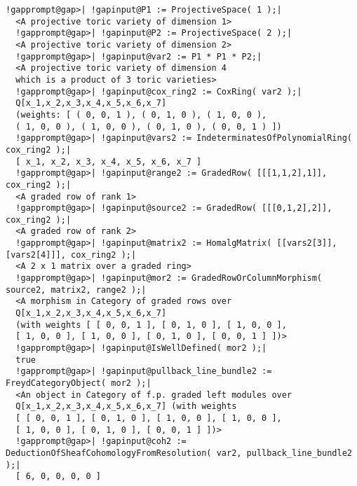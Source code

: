 \documentclass[a4paper,11pt]{report}
\begin{document}
{{\begin{Verbatim}[commandchars=!@|,fontsize=\small,frame=single,label=Example]
  !gapprompt@gap>| !gapinput@P1 := ProjectiveSpace( 1 );|
  <A projective toric variety of dimension 1>
  !gapprompt@gap>| !gapinput@P2 := ProjectiveSpace( 2 );|
  <A projective toric variety of dimension 2>
  !gapprompt@gap>| !gapinput@var2 := P1 * P1 * P2;|
  <A projective toric variety of dimension 4 
  which is a product of 3 toric varieties>
  !gapprompt@gap>| !gapinput@cox_ring2 := CoxRing( var2 );|
  Q[x_1,x_2,x_3,x_4,x_5,x_6,x_7]
  (weights: [ ( 0, 0, 1 ), ( 0, 1, 0 ), ( 1, 0, 0 ),
  ( 1, 0, 0 ), ( 1, 0, 0 ), ( 0, 1, 0 ), ( 0, 0, 1 ) ])
  !gapprompt@gap>| !gapinput@vars2 := IndeterminatesOfPolynomialRing( cox_ring2 );|
  [ x_1, x_2, x_3, x_4, x_5, x_6, x_7 ]
  !gapprompt@gap>| !gapinput@range2 := GradedRow( [[[1,1,2],1]], cox_ring2 );|
  <A graded row of rank 1>
  !gapprompt@gap>| !gapinput@source2 := GradedRow( [[[0,1,2],2]], cox_ring2 );|
  <A graded row of rank 2>
  !gapprompt@gap>| !gapinput@matrix2 := HomalgMatrix( [[vars2[3]],[vars2[4]]], cox_ring2 );|
  <A 2 x 1 matrix over a graded ring>
  !gapprompt@gap>| !gapinput@mor2 := GradedRowOrColumnMorphism( source2, matrix2, range2 );|
  <A morphism in Category of graded rows over
  Q[x_1,x_2,x_3,x_4,x_5,x_6,x_7]
  (with weights [ [ 0, 0, 1 ], [ 0, 1, 0 ], [ 1, 0, 0 ],
  [ 1, 0, 0 ], [ 1, 0, 0 ], [ 0, 1, 0 ], [ 0, 0, 1 ] ])>
  !gapprompt@gap>| !gapinput@IsWellDefined( mor2 );|
  true
  !gapprompt@gap>| !gapinput@pullback_line_bundle2 := FreydCategoryObject( mor2 );|
  <An object in Category of f.p. graded left modules over
  Q[x_1,x_2,x_3,x_4,x_5,x_6,x_7] (with weights
  [ [ 0, 0, 1 ], [ 0, 1, 0 ], [ 1, 0, 0 ], [ 1, 0, 0 ],
  [ 1, 0, 0 ], [ 0, 1, 0 ], [ 0, 0, 1 ] ])>
  !gapprompt@gap>| !gapinput@coh2 := DeductionOfSheafCohomologyFromResolution( var2, pullback_line_bundle2 );|
  [ 6, 0, 0, 0, 0 ]
\end{Verbatim}
 
}}
\end{document}
